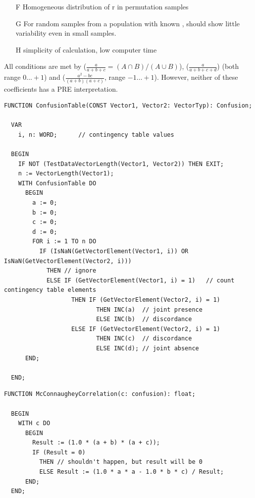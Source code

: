 \begin{refsection}
\begin{enumerate}
  \item[F]{Homogeneous distribution of r in permutation samples}
  \item[G]{For random samples from a population with known ,  should show little variability even in small samples.}
  \item[H]{simplicity of calculation, low computer time}
\end{enumerate}
All conditions are met by  \parencite{Jac-08} (\( \frac{a}{a+b+c} = (A \cap B)/(A \cup B) \)),  \parencite{Rus-40} (\( \frac{a}{a+b+c+d} \)) (both range \(0\ldots +1 \)) and  \parencite{McC-64} (\( \frac{a^2 - bc}{(a+b) (a+c)} \), range \( -1\ldots +1 \)). However, neither of these coefficients has a PRE interpretation.

\begin{lstlisting}[caption=confusion table ]
  FUNCTION ConfusionTable(CONST Vector1, Vector2: VectorTyp): Confusion;

  VAR
    i, n: WORD;      // contingency table values

  BEGIN
    IF NOT (TestDataVectorLength(Vector1, Vector2)) THEN EXIT;
    n := VectorLength(Vector1);
    WITH ConfusionTable DO
      BEGIN
        a := 0;
        b := 0;
        c := 0;
        d := 0;
        FOR i := 1 TO n DO
          IF (IsNaN(GetVectorElement(Vector1, i)) OR IsNaN(GetVectorElement(Vector2, i)))
            THEN // ignore
            ELSE IF (GetVectorElement(Vector1, i) = 1)   // count contingency table elements
                   THEN IF (GetVectorElement(Vector2, i) = 1)
                          THEN INC(a)  // joint presence
                          ELSE INC(b)  // discordance
                   ELSE IF (GetVectorElement(Vector2, i) = 1)
                          THEN INC(c)  // discordance
                          ELSE INC(d); // joint absence
      END;

  END;
\end{lstlisting}

\begin{lstlisting}[caption=\Name{McConnaughey}'s correlation ]
  FUNCTION McConnaugheyCorrelation(c: confusion): float;

  BEGIN
    WITH c DO
      BEGIN
        Result := (1.0 * (a + b) * (a + c));
        IF (Result = 0)
          THEN // shouldn't happen, but result will be 0
          ELSE Result := (1.0 * a * a - 1.0 * b * c) / Result;
      END;
  END;
\end{lstlisting}


\end{refsection}
